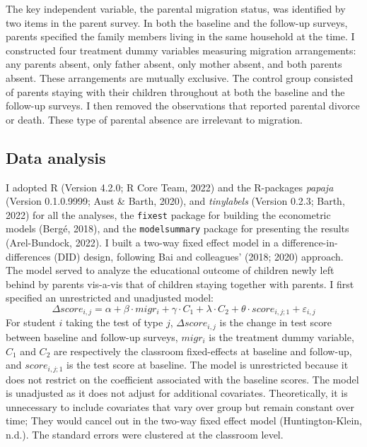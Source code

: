 \documentclass[
  man,floatsintext]{apa7}
\begin{document}
The key independent variable, the parental migration status, was identified by two items in the parent survey. In both the baseline and the follow-up surveys, parents specified the family members living in the same household at the time. I constructed four treatment dummy variables measuring migration arrangements: any parents absent, only father absent, only mother absent, and both parents absent. These arrangements are mutually exclusive. The control group consisted of parents staying with their children throughout at both the baseline and the follow-up surveys. I then removed the observations that reported parental divorce or death. These type of parental absence are irrelevant to migration.

\hypertarget{data-analysis}{%
\subsection{Data analysis}\label{data-analysis}}

I adopted R (Version 4.2.0; R Core Team, 2022) and the R-packages \emph{papaja} (Version 0.1.0.9999; Aust \& Barth, 2020), and \emph{tinylabels} (Version 0.2.3; Barth, 2022) for all the analyses, the \texttt{fixest} package for building the econometric models (Bergé, 2018), and the \texttt{modelsummary} package for presenting the results (Arel-Bundock, 2022). I built a two-way fixed effect model in a difference-in-differences (DID) design, following Bai and colleagues' (2018; 2020) approach. The model served to analyze the educational outcome of children newly left behind by parents vis-a-vis that of children staying together with parents. I first specified an unrestricted and unadjusted model: \[\Delta score_{i,j} = \alpha + \beta \cdot migr_{i} + \gamma \cdot C_{1} + \lambda \cdot C_{2} + \theta \cdot score_{i,j;1} + \varepsilon_{i,j}\] For student \(i\) taking the test of type \(j\), \(\Delta score_{i,j}\) is the change in test score between baseline and follow-up surveys, \(migr_{i}\) is the treatment dummy variable, \(C_{1}\) and \(C_{2}\) are respectively the classroom fixed-effects at baseline and follow-up, and \(score_{i,j;1}\) is the test score at baseline. The model is unrestricted because it does not restrict on the coefficient associated with the baseline scores. The model is unadjusted as it does not adjust for additional covariates. Theoretically, it is unnecessary to include covariates that vary over group but remain constant over time; They would cancel out in the two-way fixed effect model (Huntington-Klein, n.d.). The standard errors were clustered at the classroom level.
\end{document}
